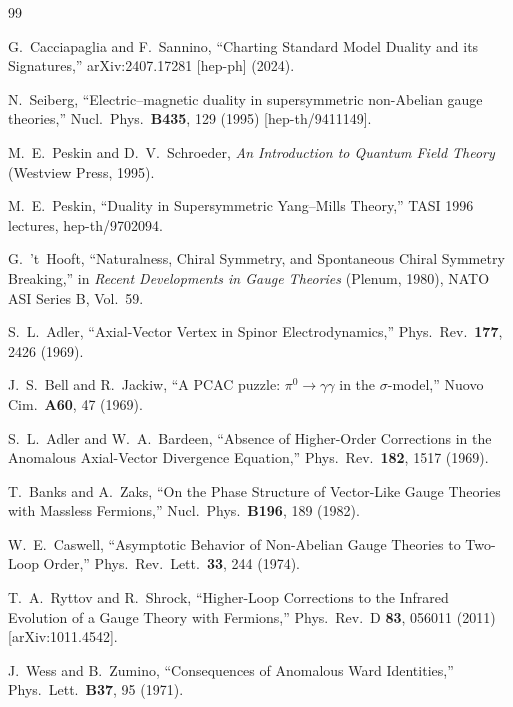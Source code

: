 \documentclass[11pt,a4paper]{article}
\begin{document}
\newpage
\begin{thebibliography}{99}

  G.~Cacciapaglia and F.~Sannino,
  ``Charting Standard Model Duality and its Signatures,''
  arXiv:2407.17281 [hep-ph] (2024).

  N.~Seiberg,
  ``Electric--magnetic duality in supersymmetric non-Abelian gauge theories,''
  Nucl.\ Phys.\ \textbf{B435}, 129 (1995)
  [hep-th/9411149].

  M.~E.~Peskin and D.~V.~Schroeder,
  \textit{An Introduction to Quantum Field Theory}
  (Westview Press, 1995).

  M.~E.~Peskin,
  ``Duality in Supersymmetric Yang--Mills Theory,''
  TASI 1996 lectures,
  hep-th/9702094.

  G.~'t~Hooft,
  ``Naturalness, Chiral Symmetry, and Spontaneous Chiral Symmetry Breaking,''
  in \textit{Recent Developments in Gauge Theories} (Plenum, 1980),
  NATO ASI Series B, Vol.~59.

  S.~L.~Adler,
  ``Axial-Vector Vertex in Spinor Electrodynamics,''
  Phys.\ Rev.\ \textbf{177}, 2426 (1969).

  J.~S.~Bell and R.~Jackiw,
  ``A PCAC puzzle: $\pi^0 \to \gamma\gamma$ in the $\sigma$-model,''
  Nuovo Cim.\ \textbf{A60}, 47 (1969).

  S.~L.~Adler and W.~A.~Bardeen,
  ``Absence of Higher-Order Corrections in the Anomalous Axial-Vector
  Divergence Equation,''
  Phys.\ Rev.\ \textbf{182}, 1517 (1969).

  T.~Banks and A.~Zaks,
  ``On the Phase Structure of Vector-Like Gauge Theories with Massless
  Fermions,''
  Nucl.\ Phys.\ \textbf{B196}, 189 (1982).

  W.~E.~Caswell,
  ``Asymptotic Behavior of Non-Abelian Gauge Theories to Two-Loop Order,''
  Phys.\ Rev.\ Lett.\ \textbf{33}, 244 (1974).

  T.~A.~Ryttov and R.~Shrock,
  ``Higher-Loop Corrections to the Infrared Evolution of a Gauge Theory
  with Fermions,''
  Phys.\ Rev.\ D \textbf{83}, 056011 (2011)
  [arXiv:1011.4542].

  J.~Wess and B.~Zumino,
  ``Consequences of Anomalous Ward Identities,''
  Phys.\ Lett.\ \textbf{B37}, 95 (1971).


\end{thebibliography}
\end{document}

